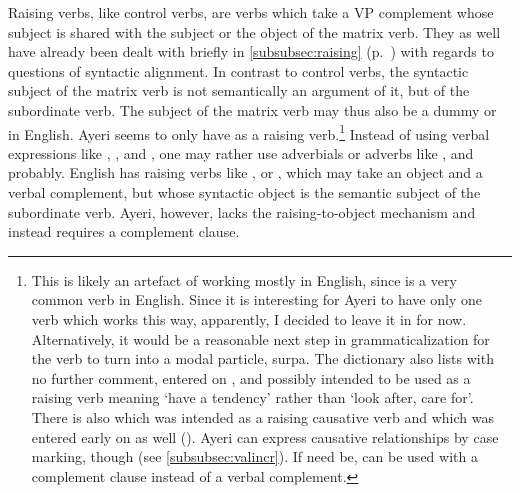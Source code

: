 Raising verbs, like control verbs, are verbs which take a VP complement whose
subject is shared with the subject or the object of the matrix verb. They as
well have already been dealt with briefly in \autoref{subsubsec:raising}
(p.~\pageref{subsubsec:raising}) with regards to questions of syntactic
alignment. In contrast to control verbs, the syntactic subject of the matrix
verb is not semantically an argument of it, but of the subordinate verb. The
subject of the matrix verb may thus also be a dummy  or  in
English. Ayeri seems to only have  as a raising
verb.\footnote{This is likely an artefact of working mostly in English, since
 is a very common verb in English. Since it is interesting for Ayeri
to have only one verb which works this way, apparently, I decided to leave it
in for now. Alternatively, it would be a reasonable next step in
grammaticalization for the verb to turn into a modal particle, 
{surpa}. The dictionary also lists  with no further
comment, entered on , and possibly intended to be used as a
raising verb meaning `have a tendency' rather than `look after, care for'.
There is also  which was intended as a
raising causative verb and which was entered early on as well
(). Ayeri can express causative relationships by case
marking, though (see \autoref{subsubsec:valincr}). If need be,
 can be used with a complement clause instead of a verbal
complement.} Instead of using verbal expressions like , ,
and , one may rather use adverbials or adverbs like
, 
and  {probably}. English has raising verbs like ,
 or , which may take an object and a verbal complement, but
whose syntactic object is the semantic subject of the subordinate verb. Ayeri,
however, lacks the raising-to-object mechanism and instead requires a
complement clause.

